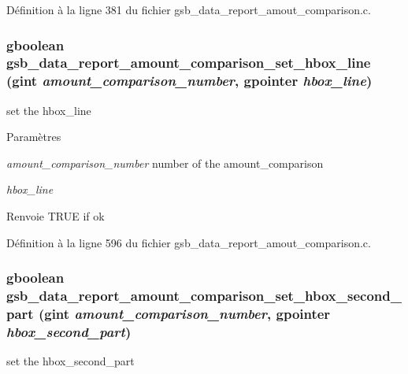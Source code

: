 Définition à la ligne 381 du fichier gsb\_\-data\_\-report\_\-amout\_\-comparison.c.

\subsubsection[{gsb\_\-data\_\-report\_\-amount\_\-comparison\_\-set\_\-hbox\_\-line}]{\setlength{\rightskip}{0pt plus 5cm}gboolean gsb\_\-data\_\-report\_\-amount\_\-comparison\_\-set\_\-hbox\_\-line (gint {\em amount\_\-comparison\_\-number}, \/  gpointer {\em hbox\_\-line})}\label{gsb__data__report__amout__comparison_8c_aaf2442526ca1c7c9f8e21c098c26083e}
set the hbox\_\-line


\begin{DoxyParams}{Paramètres}
\item[{\em amount\_\-comparison\_\-number}]number of the amount\_\-comparison \item[{\em hbox\_\-line}]\end{DoxyParams}
\begin{DoxyReturn}{Renvoie}
TRUE if ok 
\end{DoxyReturn}


Définition à la ligne 596 du fichier gsb\_\-data\_\-report\_\-amout\_\-comparison.c.

\subsubsection[{gsb\_\-data\_\-report\_\-amount\_\-comparison\_\-set\_\-hbox\_\-second\_\-part}]{\setlength{\rightskip}{0pt plus 5cm}gboolean gsb\_\-data\_\-report\_\-amount\_\-comparison\_\-set\_\-hbox\_\-second\_\-part (gint {\em amount\_\-comparison\_\-number}, \/  gpointer {\em hbox\_\-second\_\-part})}\label{gsb__data__report__amout__comparison_8c_a55b427927db85731f82e937cae02db10}
set the hbox\_\-second\_\-part


